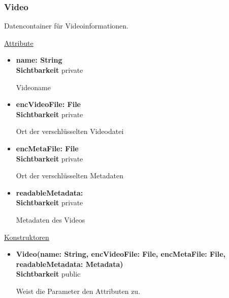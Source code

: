 \subsubsection{Video} \label{app:klasse:Video}
Datencontainer für Videoinformationen. \newline

\underline{Attribute}
\begin{itemize}
\itemsep0pt
\item \textbf{name: String} \hfill\\ 
\textbf{Sichtbarkeit} private

Videoname

\item \textbf{encVideoFile: File} \hfill\\ 
\textbf{Sichtbarkeit} private

Ort der verschlüsselten Videodatei

\item \textbf{encMetaFile: File} \hfill\\ 
\textbf{Sichtbarkeit} private

Ort der verschlüsselten Metadaten

\item \textbf{readableMetadata: } \hfill\\ 
\textbf{Sichtbarkeit} private

Metadaten des Videos
\end{itemize}

\underline{Konstruktoren}
\begin{itemize}
\itemsep0pt
\item \textbf{Video(name: String, encVideoFile: File, encMetaFile: File, readableMetadata: Metadata)} \hfill\\
\textbf{Sichtbarkeit} public

Weist die Parameter den Attributen zu.

\end{itemize}